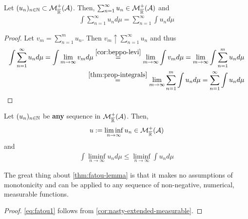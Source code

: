\begin{cor}
	Let $(u_n)_{n\in\mathbb{N}} \subset \mathcal{M}^+_{\overline{\mathbb{R}}}(\mathcal{A})$. Then, $\sum_{n = 1}^{\infty} u_n \in \mathcal{M}_{\overline{\mathbb{R}}}^+(\mathcal{A})$ and
	\begin{align}
		\int \sum_{n = 1}^\infty u_n d\mu = \sum_{n = 1}^\infty \int u_n d\mu
	\end{align}
\end{cor}

\begin{proof}
	Let $v_m = \sum_{n=1}^{m} u_n$. Then $v_m \uparrow \sum_{n=1}^{\infty} u_n$ and thus
	\begin{align*}
		\int \sum_{n = 1}^\infty u_n d\mu
		= \int \lim_{m \to \infty} v_m d\mu
		\overset{\ref{cor:beppo-levi}}{=} \lim_{m \to \infty} \int v_m d\mu
		= \lim_{m \to \infty} \int \sum_{n = 1}^m u_n d\mu \\
		\overset{\ref{thm:prop-integrals}}{=} \lim_{m \to \infty} \sum_{n=1}^{m} \int u_n d\mu
		= \sum_{n = 1}^\infty \int u_n d\mu
	\end{align*}
\end{proof}

\begin{thm}
	\label{thm:fatou-lemma}
	Let $(u_n)_{n\in\mathbb{N}}$ be \textbf{any} sequence in $\mathcal{M}_{\overline{\mathbb{R}}}^+(\mathcal{A})$. Then,
	\begin{align}
		\label{eq:fatou1}
		u := \liminf_{n\to \infty} u_n \in \mathcal{M}_{\overline{\mathbb{R}}}^+(\mathcal{A})
	\end{align}
	and
	\begin{align}
		\int \liminf_{n\to \infty} u_n d\mu \leq \liminf_{n\to \infty} \int u_n d\mu
	\end{align}
\end{thm}

The great thing about \autoref{thm:fatou-lemma} is that it makes no assumptions of monotonicity and can be applied to any sequence of non-negative, numerical, measurable functions.

\begin{proof}
	\autoref{eq:fatou1} follows from \autoref{cor:nasty-extended-measurable}.
\end{proof}